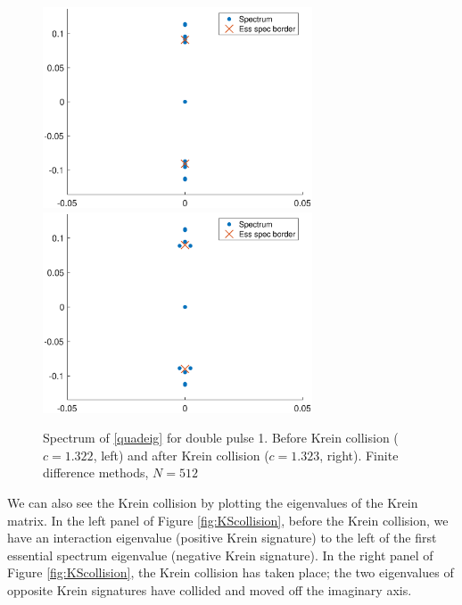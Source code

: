 \documentclass[12pt]{article}
\begin{document}
\begin{figure}[H]
\centering
\includegraphics[width=8cm]{spec1322_double2.eps}
\includegraphics[width=8cm]{spec1323_double2.eps}
\caption{Spectrum of \eqref{quadeig} for double pulse 1. Before Krein collision ($c = 1.322$, left) and after Krein collision ($c = 1.323$, right). Finite difference methods, $N = 512$}
\label{fig:Kreincollision}
\end{figure}

We can also see the Krein collision by plotting the eigenvalues of the Krein matrix. In the left panel of Figure \ref{fig:KScollision}, before the Krein collision, we have an interaction eigenvalue (positive Krein signature) to the left of the first essential spectrum eigenvalue (negative Krein signature). In the right panel of Figure \ref{fig:KScollision}, the Krein collision has taken place; the two eigenvalues of opposite Krein signatures have collided and moved off the imaginary axis.
\end{document}
